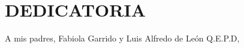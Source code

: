 \chapter*{DEDICATORIA}
\thispagestyle{empty}
A mis padres, Fabiola Garrido y Luis Alfredo de León Q.E.P.D,

